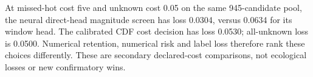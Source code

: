 At missed-hot cost five and unknown cost 0.05 on the same 945-candidate pool, the neural direct-head magnitude screen has loss 0.0304, versus 0.0634 for its window head. The calibrated CDF cost decision has loss 0.0530; all-unknown loss is 0.0500. Numerical retention, numerical risk and label loss therefore rank these choices differently. These are secondary declared-cost comparisons, not ecological losses or new confirmatory wins.
